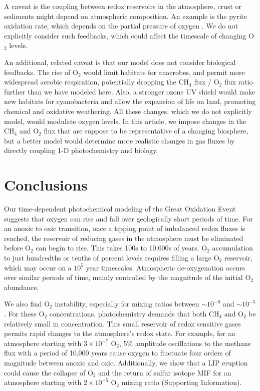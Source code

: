 A caveat is the coupling between redox reservoirs in the atmosphere, crust or sediments might depend on atmospheric composition. An example is the pyrite oxidation rate, which depends on the partial pressure of oxygen \citep{Bethan_2021}. We do not explicitly consider such feedbacks, which could affect the timescale of changing O$_2$ levels.

An additional, related caveat is that our model does not consider biological feedbacks. The rise of O$_2$ would limit habitats for anaerobes, and permit more widespread aerobic respiration, potentially dropping the CH$_4$ flux / O$_2$ flux ratio further than we have modeled here. Also, a stronger ozone UV shield would make new habitats for cyanobacteria and allow the expansion of life on land, promoting chemical and oxidative weathering. All these changes, which we do not explicitly model, would modulate oxygen levels. In this article, we impose changes in the CH$_4$ and O$_2$ flux that are suppose to be representative of a changing biosphere, but a better model would determine more realistic changes in gas fluxes by directly coupling 1-D photochemistry and biology.

\section{Conclusions}

Our time-dependent photochemical modeling of the Great Oxidation Event suggests that oxygen can rise and fall over geologically short periods of time. For an anoxic to oxic transition, once a tipping point of imbalanced redox fluxes is reached, the reservoir of reducing gases in the atmosphere must be eliminated before O$_2$ can begin to rise. This takes 100s to 10,000s of years. O$_2$ accumulation to just hundredths or tenths of percent levels requires filling a large O$_2$ reservoir, which may occur on a $10^5$ year timescales. Atmospheric de-oxygenation occurs over similar periods of time, mainly controlled by the magnitude of the initial O$_2$ abundance.

We also find O$_2$ instability, especially for mixing ratios between $\sim10^{-8}$ and $\sim10^{-5}$. For these O$_2$ concentrations, photochemistry demands that both CH$_4$ and O$_2$ be relatively small in concentration. This small reservoir of redox sensitive gases permits rapid changes to the atmosphere’s redox state. For example, for an atmosphere starting with $3 \times 10^{-7}$ O$_2$, 5\% amplitude oscillations to the methane flux with a period of 10,000 years cause oxygen to fluctuate four orders of magnitude between anoxic and oxic. Additionally, we show that a LIP eruption could cause the collapse of O$_2$ and the return of sulfur isotope MIF for an atmosphere starting with $2 \times 10^{-5}$ O$_2$ mixing ratio (Supporting Information).

